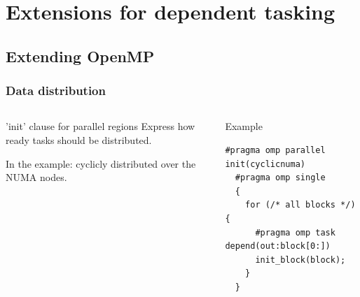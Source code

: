 \documentclass[xcolor={usenames,dvipsnames,svgnames,table}, aspectratio=43]{beamer}
\begin{document}
\section{Extensions for dependent tasking}

\subsection{Extending OpenMP}

\begin{frame}[fragile]
\frametitle{Data distribution}
\begin{columns}[T,onlytextwidth]
\begin{block}{'init' clause for parallel regions}
Express how ready tasks should be distributed.

      \textcolor{YellowOrange}{
        In the example: cyclicly distributed over the NUMA nodes.
    }
\end{block}



\begin{block}{Example}
  \begin{lstlisting}[numbers=none]
  #pragma omp parallel init(cyclicnuma)
  #pragma omp single
  {
    for (/* all blocks */) {
      #pragma omp task depend(out:block[0:])
      init_block(block);
    }
  }
  \end{lstlisting}
\end{block}
\end{columns}

\end{frame}
\end{document}
